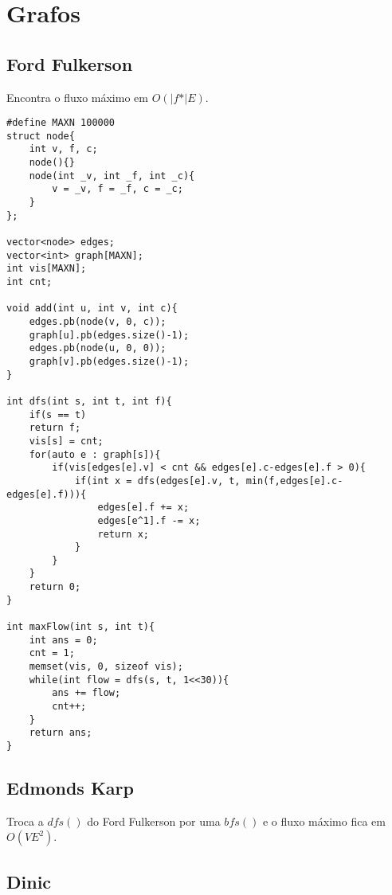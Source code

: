 \chapter{Grafos}

\section{Ford Fulkerson}

Encontra o fluxo máximo em $O(|\textit{f*}|E)$.
\begin{multicols}{2}
	\begin{lstlisting}
#define MAXN 100000
struct node{
	int v, f, c;
	node(){}
	node(int _v, int _f, int _c){
		v = _v, f = _f, c = _c;
	}
};

vector<node> edges;
vector<int> graph[MAXN];
int vis[MAXN];
int cnt;

void add(int u, int v, int c){
	edges.pb(node(v, 0, c));
	graph[u].pb(edges.size()-1);
	edges.pb(node(u, 0, 0));
	graph[v].pb(edges.size()-1);
}

int dfs(int s, int t, int f){
	if(s == t)
	return f;
	vis[s] = cnt;
	for(auto e : graph[s]){
		if(vis[edges[e].v] < cnt && edges[e].c-edges[e].f > 0){
			if(int x = dfs(edges[e].v, t, min(f,edges[e].c-edges[e].f))){
				edges[e].f += x;
				edges[e^1].f -= x;
				return x;
			}
		}
	}
	return 0;
}

int maxFlow(int s, int t){
	int ans = 0;
	cnt = 1;
	memset(vis, 0, sizeof vis);
	while(int flow = dfs(s, t, 1<<30)){
		ans += flow;
		cnt++;
	}
	return ans;
}
	\end{lstlisting}
\end{multicols}


\section{Edmonds Karp}

Troca a $dfs()$ do Ford Fulkerson por uma $bfs()$ e o fluxo máximo fica em $O(VE^2)$.

\section{Dinic}


